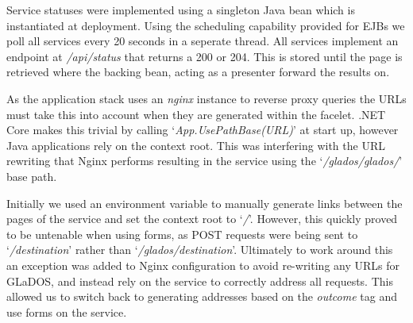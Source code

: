 \par
Service statuses were implemented using a singleton Java bean which is instantiated at deployment. Using the scheduling capability provided for EJBs we poll all services every 20 seconds in a seperate thread. All services implement an endpoint at \textit{/api/status} that returns a 200 or 204. This is stored until the page is retrieved where the backing bean, acting as a presenter forward the results on.

\par
As the application stack uses an \textit{nginx} instance to reverse proxy queries the URLs must take this into account when they are generated within the facelet. .NET Core makes this trivial by calling `\textit{App.UsePathBase(URL)}' at start up, however Java applications rely on the context root. This was interfering with the URL rewriting that Nginx performs resulting in the service using the 
`\textit{/glados/glados/}' base path.

\par
Initially we used an environment variable to manually generate links between the pages of the service and set the context root to 
`\textit{/}'. However, this quickly proved to be untenable when using forms, as POST requests were being sent to 
`\textit{/destination}' 
rather than 
`\textit{/glados/destination}'. Ultimately to work around this an exception was added to Nginx configuration to avoid re-writing any URLs for GLaDOS, and instead rely on the service to correctly address all requests. This allowed us to switch back to generating addresses based on the \textit{outcome} tag and use forms on the service.